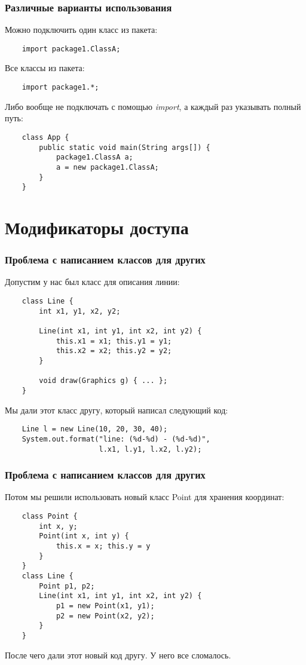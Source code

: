 \begin{frame}[fragile]
	\frametitle{Различные варианты использования}

	\begin{large}
	Можно подключить один класс из пакета:
	\begin{verbatim}
	import package1.ClassA;
	\end{verbatim}

	Все классы из пакета:
	\begin{verbatim}
	import package1.*;
	\end{verbatim}

	Либо вообще не подключать с помощью \emph{import}, а каждый раз указывать полный путь:
	\begin{verbatim}
	class App {
	    public static void main(String args[]) {
	        package1.ClassA a;
	        a = new package1.ClassA;
	    }
	}
	\end{verbatim}
	\end{large}
\end{frame}

\section{Модификаторы доступа}

\begin{frame}[fragile]
	\frametitle{Проблема с написанием классов для других}
	Допустим у нас был класс для описания линии:
	\begin{verbatim}
	class Line {
	    int x1, y1, x2, y2;

	    Line(int x1, int y1, int x2, int y2) {
	        this.x1 = x1; this.y1 = y1;
	        this.x2 = x2; this.y2 = y2;
	    }

	    void draw(Graphics g) { ... };
	}
	\end{verbatim}

	Мы дали этот класс другу, который написал следующий код:
	\begin{verbatim}
	Line l = new Line(10, 20, 30, 40);
	System.out.format("line: (%d-%d) - (%d-%d)",
	                  l.x1, l.y1, l.x2, l.y2);
	\end{verbatim}
\end{frame}

\begin{frame}[fragile]
	\frametitle{Проблема с написанием классов для других}
	Потом мы решили использовать новый класс Point для хранения координат:
	\begin{verbatim}
	class Point {
	    int x, y;
	    Point(int x, int y) {
	        this.x = x; this.y = y
	    }
	}
	class Line {
	    Point p1, p2;
	    Line(int x1, int y1, int x2, int y2) {
	        p1 = new Point(x1, y1);
	        p2 = new Point(x2, y2);
	    }
	}
	\end{verbatim}

	После чего дали этот новый код другу. У него все сломалось.
\end{frame}

